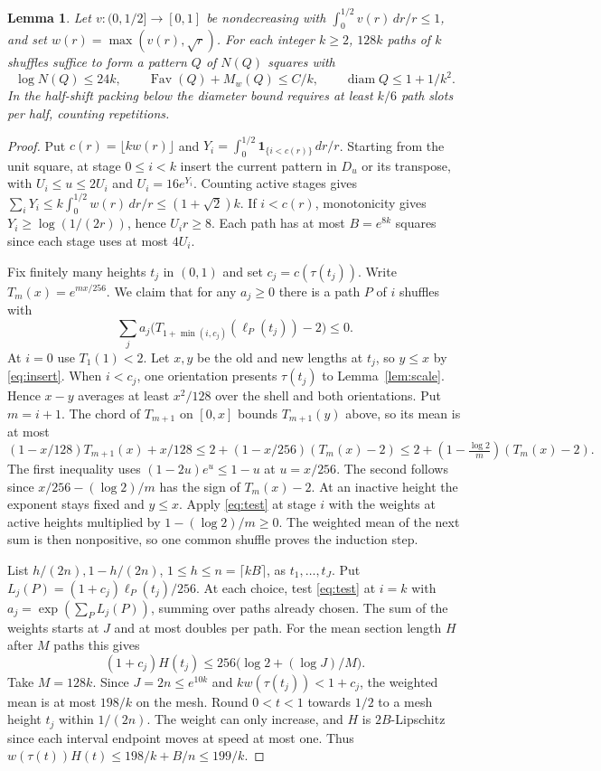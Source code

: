 \documentclass[11pt,reqno]{amsart}
\newtheorem{lemma}{Lemma}
\newcommand{\Fav}{\operatorname{Fav}}
\newcommand{\diam}{\operatorname{diam}}
\begin{document}
\begin{lemma}\label{lem:block}
Let $v:(0,1/2]\to[0,1]$ be nondecreasing with $\int_0^{1/2}v(r)\,dr/r\le1$, and set $w(r)=\max(v(r),\sqrt r)$. For each integer $k\ge2$, $128k$ paths of $k$ shuffles suffice to form a pattern $Q$ of $N(Q)$ squares with
\[
 \log N(Q)\le24k,\qquad \Fav(Q)+M_w(Q)\le C/k,\qquad \diam Q\le1+1/k^2.
\]
In the half-shift packing below the diameter bound requires at least $k/6$ path slots per half, counting repetitions.
\end{lemma}
\begin{proof}
Put $c(r)=\lfloor kw(r)\rfloor$ and $Y_i=\int_0^{1/2}\mathbf1_{\{i<c(r)\}}\,dr/r$. Starting from the unit square, at stage $0\le i<k$ insert the current pattern in $D_u$ or its transpose, with $U_i\le u\le2U_i$ and $U_i=16e^{Y_i}$. Counting active stages gives $\sum_iY_i\le k\int_0^{1/2} w(r)\,dr/r\le(1+\sqrt2)k$. If $i<c(r)$, monotonicity gives $Y_i\ge\log(1/(2r))$, hence $U_i r\ge8$. Each path has at most $B=e^{8k}$ squares since each stage uses at most $4U_i$.

Fix finitely many heights $t_j$ in $(0,1)$ and set $c_j=c(\tau(t_j))$. Write $T_m(x)=e^{mx/256}$. We claim that for any $a_j\ge0$ there is a path $P$ of $i$ shuffles with
\begin{equation}\label{eq:test}
 \sum_j a_j\bigl(T_{1+\min(i,c_j)}(\ell_P(t_j))-2\bigr)\le0 .
\end{equation}
At $i=0$ use $T_1(1)<2$. Let $x,y$ be the old and new lengths at $t_j$, so $y\le x$ by \eqref{eq:insert}. When $i<c_j$, one orientation presents $\tau(t_j)$ to Lemma~\ref{lem:scale}. Hence $x-y$ averages at least $x^2/128$ over the shell and both orientations. Put $m=i+1$. The chord of $T_{m+1}$ on $[0,x]$ bounds $T_{m+1}(y)$ above, so its mean is at most
\[
 (1-x/128)T_{m+1}(x)+x/128
 \le 2+(1-x/256)(T_m(x)-2)
 \le 2+(1-\tfrac{\log2}{m})(T_m(x)-2).
\]
The first inequality uses $(1-2u)e^u\le1-u$ at $u=x/256$. The second follows since $x/256-(\log2)/m$ has the sign of $T_m(x)-2$. At an inactive height the exponent stays fixed and $y\le x$. Apply \eqref{eq:test} at stage $i$ with the weights at active heights multiplied by $1-(\log2)/m\ge0$. The weighted mean of the next sum is then nonpositive, so one common shuffle proves the induction step.

List $h/(2n),1-h/(2n)$, $1\le h\le n=\lceil kB\rceil$, as $t_1,\ldots,t_J$. Put $L_j(P)=(1+c_j)\ell_P(t_j)/256$. At each choice, test \eqref{eq:test} at $i=k$ with $a_j=\exp(\sum_P L_j(P))$, summing over paths already chosen. The sum of the weights starts at $J$ and at most doubles per path. For the mean section length $H$ after $M$ paths this gives
\[
 (1+c_j)H(t_j)\le256\bigl(\log2+(\log J)/M\bigr).
\]
Take $M=128k$. Since $J=2n\le e^{10k}$ and $kw(\tau(t_j))<1+c_j$, the weighted mean is at most $198/k$ on the mesh. Round $0<t<1$ towards $1/2$ to a mesh height $t_j$ within $1/(2n)$. The weight can only increase, and $H$ is $2B$-Lipschitz since each interval endpoint moves at speed at most one. Thus $w(\tau(t))H(t)\le198/k+B/n\le199/k$.


\end{proof}
\end{document}
